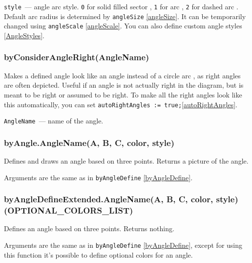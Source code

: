 	\texttt{style}~— angle arc style. \texttt{0} for solid filled sector , \texttt{1} for arc , \texttt{2} for dashed arc . Default arc radius is determined by \texttt{angleSize} \ref{angleSize}. It can be temporarily changed using \texttt{angleScale} \ref{angleScale}. You can also define custom angle styles \ref{AngleStyles}. 
	
\subsubsection{byConsiderAngleRight(AngleName)}\label{byConsiderAngleRight}

	Makes a defined angle look like an angle  instead of a circle arc , as right angles are often depicted. Useful if an angle is not actually right in the diagram, but is meant to be right or assumed to be right. To make all the right angles look like this automatically, you can set \texttt{autoRightAngles := true;}\ref{autoRightAngles}.
	
	\texttt{AngleName}~— name of the angle. 


\subsubsection{byAngle.AngleName(A, B, C, color, style)}\label{byAngle}

	Defines and draws an angle based on three points. Returns a picture of the angle.
	
	Arguments are the same as in \texttt{byAngleDefine} \ref{byAngleDefine}.

\subsubsection{byAngleDefineExtended.AngleName(A, B, C, color, style)(OPTIONAL\_COLORS\_LIST)}\label{byAngleDefineExtended}

	Defines an angle based on three points. Returns nothing.
	
	Arguments are the same as in \texttt{byAngleDefine} \ref{byAngleDefine}, except for using this function it's possible to define optional colors for an angle.
	
